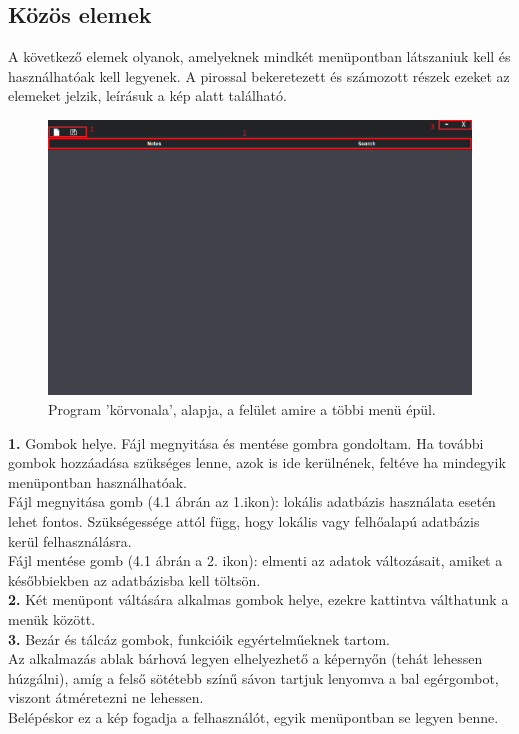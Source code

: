 \subsection{Közös elemek}

A következő elemek olyanok, amelyeknek mindkét menüpontban látszaniuk kell és használhatóak kell legyenek. A pirossal bekeretezett és számozott részek ezeket az elemeket jelzik, leírásuk a kép alatt található.

\begin{figure}[h]
	\centering
	\includegraphics[scale=0.5]{images/menu_1.png}
	\caption{Program 'körvonala', alapja, a felület amire a többi menü épül.}
	\label{fig:main_foundation}
\end{figure}

\noindent \textbf{1.} Gombok helye. Fájl megnyitása és mentése gombra gondoltam. Ha további gombok hozzáadása szükséges lenne,  azok is ide kerülnének, feltéve ha mindegyik menüpontban használhatóak.
\vspace{5pt} \\Fájl megnyitása gomb (4.1 ábrán az 1.ikon): lokális adatbázis használata esetén lehet fontos. Szükségessége attól függ, hogy lokális vagy felhőalapú adatbázis kerül felhasználásra.
\vspace{5pt} \\Fájl mentése gomb (4.1 ábrán a 2. ikon): elmenti az adatok változásait, amiket a későbbiekben az adatbázisba kell töltsön.
\vspace{5pt} \\ \textbf{2.} Két menüpont váltására alkalmas gombok helye, ezekre kattintva válthatunk a menük között.
\vspace{5pt} \\ \textbf{3.} Bezár és tálcáz gombok, funkcióik egyértelműeknek tartom.
\vspace{10pt} \\Az alkalmazás ablak bárhová legyen elhelyezhető a képernyőn (tehát lehessen húzgálni), amíg a felső sötétebb színű sávon tartjuk lenyomva  a bal egérgombot, viszont átméretezni ne lehessen.
\vspace{5pt} \\Belépéskor ez a kép fogadja a felhasználót, egyik menüpontban se legyen benne. 

